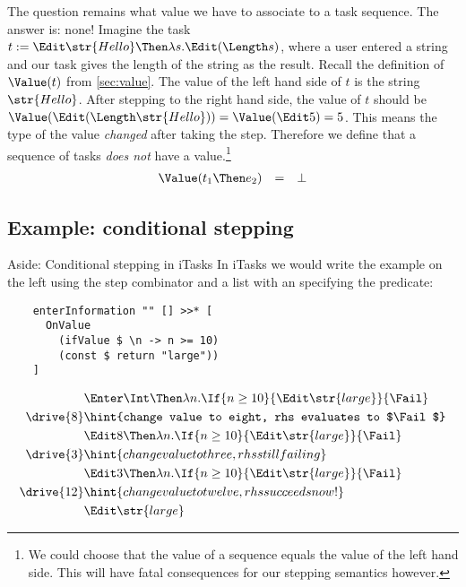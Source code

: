 The question remains what value we have to associate to a task sequence.
The answer is: none!
Imagine the task $t := \Edit \str{Hello} \Then \lambda s.\allowbreak\Edit (\Length s)$,
where a user entered a string and our task gives the length of the string as the result.
Recall the definition of $\Value(t)$ from \autoref{sec:value}.
The value of the left hand side of $t$ is the string $\str{Hello}$.
After stepping to the right hand side,
the value of $t$ should be $\Value(\Edit (\Length\str{Hello})) = \Value(\Edit 5) = 5$.
This means the type of the value \emph{changed} after taking the step.
Therefore we define that a sequence of tasks \emph{does not} have a value.\footnote{
  We could choose that the value of a sequence equals the value of the left hand side.
  This will have fatal consequences for our stepping semantics however.
}
\begin{equation*}
  \begin{array}{lcl}
    \Value(t_1 \Then e_2) &=& \bot
  \end{array}
\end{equation*}


\subsection{Example: conditional stepping}


\begin{margintext}{Aside: Conditional stepping in iTasks}
  In iTasks we would write the example on the left using the step combinator
  and a list with an  specifying the predicate:
  \begin{verbatim}
    enterInformation "" [] >>* [
      OnValue
        (ifValue $ \n -> n >= 10)
        (const $ return "large"))
    ]
  \end{verbatim}
\end{margintext}

\begin{align*}
    & \Enter \Int \Then \lambda n. \If{n \ge 10}{\Edit \str{large}}{\Fail} \\
  \drive{8} & \hint{change value to eight, rhs evaluates to $\Fail$} \\
    & \Edit 8 \Then \lambda n. \If{n \ge 10}{\Edit \str{large}}{\Fail} \\
  \drive{3} & \hint{change value to three, rhs still failing} \\
    & \Edit 3 \Then \lambda n. \If{n \ge 10}{\Edit \str{large}}{\Fail} \\
  \drive{12} & \hint{change value to twelve, rhs succeeds now!} \\
    & \Edit \str{large}
\end{align*}



